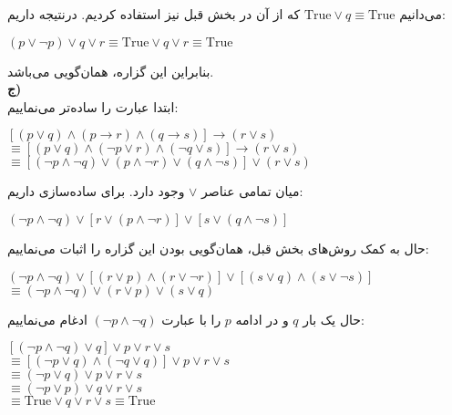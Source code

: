 می‌دانیم $\text{True} \vee q \equiv \text{True}$ که از آن در بخش قبل نیز استفاده کردیم. درنتیجه داریم:
\begin{center}
    $(p \vee \neg p) \vee q \vee r \equiv
    \text{True} \vee q \vee r \equiv
    \text{True}$
\end{center}
بنابراین این گزاره، همان‌گویی می‌باشد.\\[0.25in]
\textbf{ج)}\\[0.1in]
ابتدا عبارت را ساده‌تر می‌نماییم:
\begin{center}
    $[ (p \vee q) \wedge (p \rightarrow r) \wedge
    (q \rightarrow s)] \rightarrow (r \vee s)$\\[0.05in]
    $\equiv 
    [(p \vee q) \wedge (\neg p \vee r) \wedge (\neg q \vee s)]
    \rightarrow (r \vee s)$\\[0.05in]
    $\equiv 
    [(\neg p \wedge \neg q) \vee (p \wedge \neg r) \vee 
    (q \wedge \neg s)] \vee (r \vee s)$
\end{center}
میان تمامی عناصر $\vee$ وجود دارد. برای ساده‌سازی داریم:
\begin{center}
    $(\neg p \wedge \neg q) \vee [r \vee (p \wedge \neg r)] \vee
    [s \vee (q \wedge \neg s)]$
\end{center}
حال به کمک روش‌های بخش قبل، همان‌گویی بودن این گزاره را اثبات می‌نماییم:
\begin{center}
    $(\neg p \wedge \neg q) \vee
    [(r \vee p) \wedge (r \vee \neg r)] \vee
    [(s \vee q) \wedge (s \vee \neg s)]$\\[0.05in]
    $\equiv 
    (\neg p \wedge \neg q) \vee (r \vee p) \vee (s \vee q)$
\end{center}
حال یک بار $q$ و در ادامه $p$ را با عبارت $(\neg p \wedge \neg q)$ ادغام می‌نماییم:
\begin{center}
    $[(\neg p \wedge \neg q) \vee q] \vee p \vee r \vee s$\\[0.05in]
    $\equiv 
    [(\neg p \vee q) \wedge (\neg q \vee q)] \vee p  \vee r \vee s$
    \\[0.05in]
    $\equiv (\neg p \vee q) \vee p  \vee r \vee s$\\[0.05in]
    $\equiv (\neg p \vee p) \vee q \vee r \vee s$\\[0.05in]
    $\equiv \text{True} \vee q \vee r \vee s \equiv \text{True}$
\end{center}